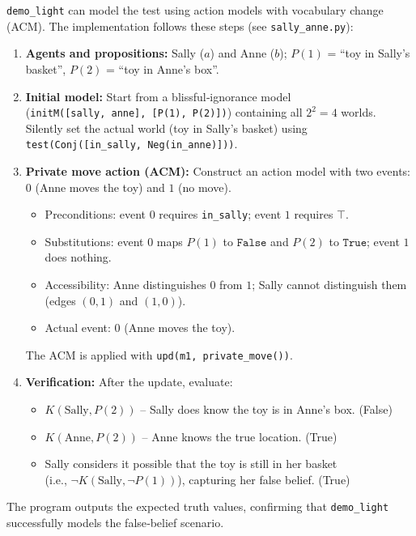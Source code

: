 \texttt{demo\_light} can model the test using action 
models with vocabulary change (ACM). 
The implementation follows these steps (see \texttt{sally\_anne.py}):

\begin{enumerate}
    \item \textbf{Agents and propositions:} Sally ($a$) and Anne ($b$); 
        $P(1)$ = “toy in Sally’s basket”, $P(2)$ = “toy in Anne’s box”.
    \item \textbf{Initial model:} Start from a blissful‑ignorance model \\
        (\texttt{initM([sally, anne], [P(1), P(2)])}) 
        containing all $2^2=4$ worlds.
        Silently set the actual world (toy in Sally’s basket) using \\
        \texttt{test(Conj([in\_sally, Neg(in\_anne)]))}.
    \item \textbf{Private move action (ACM):} 
        Construct an action model with
        two events: $0$ (Anne moves the toy) and $1$ (no move).
        \begin{itemize}
            \item Preconditions: event $0$ requires \texttt{in\_sally}; 
                event $1$ requires $\top$.
            \item Substitutions: event $0$ maps $P(1)$ to $\texttt{False}$ 
                and $P(2)$ to $\texttt{True}$; event $1$ does nothing.
            \item Accessibility: Anne distinguishes $0$ from $1$; 
                Sally cannot distinguish them (edges $(0,1)$ and $(1,0)$).
            \item Actual event: $0$ (Anne moves the toy).
        \end{itemize}
        The ACM is applied with \texttt{upd(m1, private\_move())}.
    \item \textbf{Verification:} After the update, evaluate:
        \begin{itemize}
            \item $K(\text{Sally}, P(2))$ – 
            Sally does know the toy is in Anne’s box. (False)
            \item $K(\text{Anne}, P(2))$ – Anne knows the true location. (True)
            \item Sally considers it possible that the toy is still in her basket\\ 
                (i.e., $\neg K(\text{Sally}, \neg P(1))$), 
                capturing her false belief. (True)
        \end{itemize}
\end{enumerate}

The program outputs the expected truth values, 
confirming that \texttt{demo\_light} successfully models the false‑belief scenario.